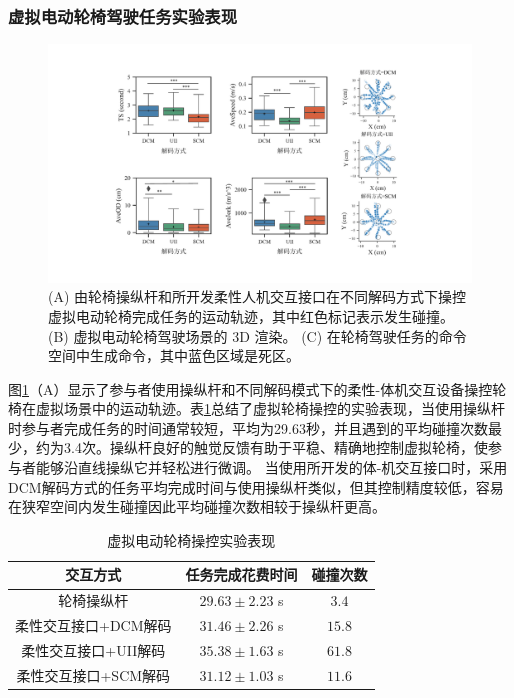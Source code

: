 \subsubsection{虚拟电动轮椅驾驶任务实验表现}     
  
\begin{figure}[htb]
    \includegraphics[width=1\textwidth]{figures/3-Fig-13.pdf}
    \caption{(A) 由轮椅操纵杆和所开发柔性人机交互接口在不同解码方式下操控虚拟电动轮椅完成任务的运动轨迹，其中红色标记表示发生碰撞。(B) 虚拟电动轮椅驾驶场景的 3D 渲染。 (C) 在轮椅驾驶任务的命令空间中生成命令，其中蓝色区域是死区。}
    \label{fig:3-13}
\end{figure}  

图\ref{fig:3-13}（A）显示了参与者使用操纵杆和不同解码模式下的柔性-体机交互设备操控轮椅在虚拟场景中的运动轨迹。表\ref{tab3-2}总结了虚拟轮椅操控的实验表现，当使用操纵杆时参与者完成任务的时间通常较短，平均为29.63秒，并且遇到的平均碰撞次数最少，约为3.4次。操纵杆良好的触觉反馈有助于平稳、精确地控制虚拟轮椅，使参与者能够沿直线操纵它并轻松进行微调。 当使用所开发的体-机交互接口时，采用DCM解码方式的任务平均完成时间与使用操纵杆类似，但其控制精度较低，容易在狭窄空间内发生碰撞因此平均碰撞次数相较于操纵杆更高。  

\begin{table}[htb]
 \centering
 \caption{虚拟电动轮椅操控实验表现}
 \setlength{\tabcolsep}{5pt}
 \begin{tabular}{c c c}
 \hline\hline
  交互方式 & 任务完成花费时间 & 碰撞次数  \\  
 \hline
 轮椅操纵杆&     $29.63\pm 2.23$      s&        $3.4$         \\ 
 柔性交互接口+DCM解码&        $31.46\pm 2.26$        s&        $15.8$         \\ 
 柔性交互接口+UII解码&        $35.38\pm 1.63$        s&        $61.8$         \\ 
 柔性交互接口+SCM解码&        $31.12\pm 1.03$        s&        $11.6$         \\  
 \hline\hline
 \end{tabular}
 \label{tab3-2}
\end{table}     

